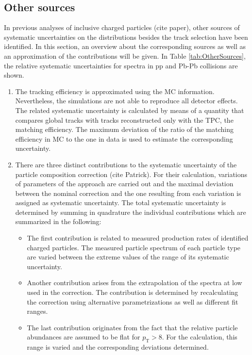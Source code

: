 \documentclass[12pt,a4paper]{report}
\begin{document}
\subsection{Other sources} 
In previous analyses of inclusive charged particles (cite paper), other sources of systematic uncertainties on the \pt distributions besides the track selection have been identified. In this section, an overview about the corresponding sources as well as an approximation of the contributions will be given. In Table \ref{tab:OtherSources}, the relative systematic uncertainties for \pt spectra in pp and Pb-Pb collisions are shown. 
\begin{enumerate} 
\item The tracking efficiency is approximated using the MC information. Nevertheless, the simulations are not able  to reproduce all detector effects. The related systematic uncertainty is calculated by means of a quantity that compares global tracks with tracks reconstructed only with the TPC, the matching efficiency. The maximum deviation of the ratio of the matching efficiency in MC to the one in data is used to estimate the corresponding uncertainty.
\item There are three distinct contributions to the systematic uncertainty of the particle composition correction (cite Patrick). For their calculation, variations of parameters of the approach are carried out and the maximal deviation between the nominal correction and the one resulting from each variation is assigned as systematic uncertainty. The total systematic uncertainty is determined by summing in quadrature the individual contributions which are summarized in the following:
\begin{itemize}
\item The first contribution is related to measured production rates of identified charged particles. The measured particle spectrum of each particle type are varied between the extreme values of the range of its systematic uncertainty.
\item Another contribution arises from the extrapolation of the \pt spectra at low \pt used in the correction. The contribution is determined by recalculating the correction using alternative parametrizations as well as different fit ranges.
\item The last contribution originates from the fact that the relative particle abundances are assumed to be flat for $p_\text{T} > 8$. For the calculation, this range is varied and the corresponding deviations determined.  
\end{itemize} 

\end{enumerate}
\end{document}
